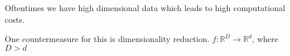 Oftentimes we have high dimensional data which leads to high computational costs. 

One countermeasure for this is dimensionality reduction. $f: \mathbb{R}^D \rightarrow \mathbb{R}^d$, where $D > d$



